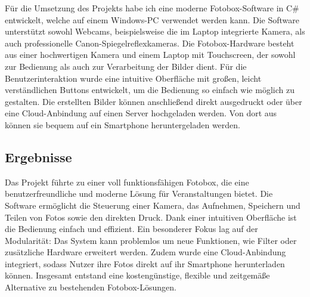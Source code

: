 Für die Umsetzung des Projekts habe ich eine moderne Fotobox-Software in C\# entwickelt,
welche auf einem Windows-PC verwendet werden kann. Die Software unterstützt sowohl Webcams,
beispielsweise die im Laptop integrierte Kamera, als auch professionelle Canon-Spiegelreflexkameras.
Die Fotobox-Hardware besteht aus einer hochwertigen Kamera und einem Laptop mit Touchscreen,
der sowohl zur Bedienung als auch zur Verarbeitung der Bilder dient. 
Für die Benutzerinteraktion wurde eine intuitive Oberfläche mit großen,
leicht verständlichen Buttons entwickelt, um die Bedienung so einfach wie
möglich zu gestalten. Die erstellten Bilder können anschließend direkt
ausgedruckt oder über eine Cloud-Anbindung auf einen Server hochgeladen werden.
Von dort aus können sie bequem auf ein Smartphone heruntergeladen werden.

\subsection{Ergebnisse}

Das Projekt führte zu einer voll funktionsfähigen Fotobox, die eine
benutzerfreundliche und moderne Lösung für Veranstaltungen bietet.
Die Software ermöglicht die Steuerung einer Kamera, das Aufnehmen,
Speichern und Teilen von Fotos sowie den direkten Druck. Dank einer intuitiven
Oberfläche ist die Bedienung einfach und effizient.
Ein besonderer Fokus lag auf der Modularität: Das System kann problemlos
um neue Funktionen, wie Filter oder zusätzliche Hardware erweitert werden.
Zudem wurde eine Cloud-Anbindung integriert, sodass Nutzer ihre Fotos direkt
auf ihr Smartphone herunterladen können. Insgesamt entstand eine kostengünstige,
flexible und zeitgemäße Alternative zu bestehenden Fotobox-Lösungen.